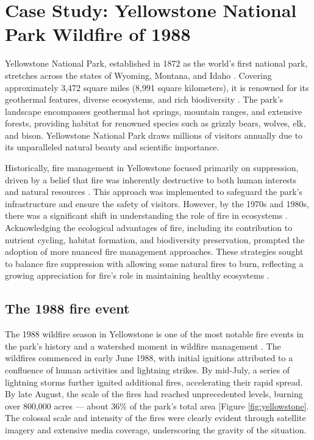 \documentclass[
  12 pt,
]{Nemilov}
\begin{document}
\section{Case Study: Yellowstone National Park Wildfire of 1988}\label{case-study-yellowstone-national-park-wildfire-of-1988}

Yellowstone National Park, established in 1872 as the world's first national park, stretches across the states of Wyoming, Montana, and Idaho \citep{haines1974yellowstone, jackson1942creation}. Covering approximately 3,472 square miles (8,991 square kilometers), it is renowned for its geothermal features, diverse ecosystems, and rich biodiversity \citep{chittenden2018yellowstone, keefer1971geologic}. The park's landscape encompasses geothermal hot springs, mountain ranges, and extensive forests, providing habitat for renowned species such as grizzly bears, wolves, elk, and bison. Yellowstone National Park draws millions of visitors annually due to its unparalleled natural beauty and scientific importance.

Historically, fire management in Yellowstone focused primarily on suppression, driven by a belief that fire was inherently destructive to both human interests and natural resources \citep{barker2013scorched}. This approach was implemented to safeguard the park's infrastructure and ensure the safety of visitors. However, by the 1970s and 1980s, there was a significant shift in understanding the role of fire in ecosystems \citep{sellers1976fire, taylor1973some}. Acknowledging the ecological advantages of fire, including its contribution to nutrient cycling, habitat formation, and biodiversity preservation, prompted the adoption of more nuanced fire management approaches. These strategies sought to balance fire suppression with allowing some natural fires to burn, reflecting a growing appreciation for fire's role in maintaining healthy ecosystems \citep{barker2013scorched}.

\subsection{The 1988 fire event}\label{the-1988-fire-event}

The 1988 wildfire season in Yellowstone is one of the most notable fire events in the park's history and a watershed moment in wildfire management \citep{romme1989historical}. The wildfires commenced in early June 1988, with initial ignitions attributed to a confluence of human activities and lightning strikes. By mid-July, a series of lightning storms further ignited additional fires, accelerating their rapid spread. By late August, the scale of the fires had reached unprecedented levels, burning over 800,000 acres --- about 36\% of the park's total area {[}Figure \ref{fig:yellowstone}\citep{nasa-yellowstone}. The colossal scale and intensity of the fires were clearly evident through satellite imagery and extensive media coverage, underscoring the gravity of the situation.
\end{document}
